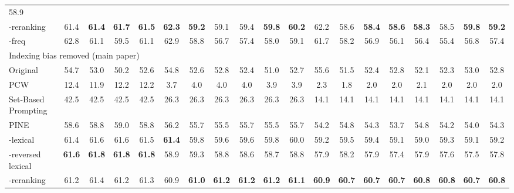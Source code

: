 \begin{table*}[!t]
{\begin{tabular}{@{}lcccccccccccccccccc@{}}
  58.9 \\ 
  \multicolumn{1}{l|}{\ours{}-reranking} &
  61.4 &
  \textbf{61.4} &
  \textbf{61.7} &
  \multicolumn{1}{c|}{\textbf{61.5}} &
  \textbf{62.3} &
  \textbf{59.2} &
   59.1 &
  59.4 &
  \textbf{59.8} &
  \multicolumn{1}{c|}{\textbf{60.2}} &
  62.2 &
  58.6 &
  \textbf{58.4} &
  \textbf{58.6} &
  \textbf{58.3} &
  58.5 &
  \textbf{59.8} &
  \textbf{59.2} \\ 
  \multicolumn{1}{l|}{\ours{}-freq} &
  62.8 &
  61.1 &
  59.5 &
  \multicolumn{1}{c|}{61.1} &
  62.9 &
  58.8 &
  56.7 &
  57.4 &
  58.0 &
  \multicolumn{1}{c|}{59.1} &
  61.7 &
  58.2 &
  56.9 &
  56.1 &
  56.4 &
  55.4 &
  56.8 &
  57.4 \\
  \midrule
\multicolumn{19}{l}{Indexing bias removed (main paper)} \\ \midrule
\multicolumn{1}{l|}{Original} &
  54.7 &
  53.0 &
  50.2 &
  \multicolumn{1}{c|}{52.6} &
  54.8 &
  52.6 &
  52.8 &
  52.4 &
  51.0 &
  \multicolumn{1}{c|}{52.7} &
  55.6 &
  51.5 &
  52.4 &
  52.8 &
  52.1 &
  52.3 &
  53.0 &
  52.8 \\
\multicolumn{1}{l|}{PCW} &
  12.4 &
  11.9 &
  12.2 &
  \multicolumn{1}{c|}{12.2} &
  \phantom{0}3.7 &
   \phantom{0}4.0 &
   \phantom{0}4.0 &
   \phantom{0}4.0 &
   \phantom{0}3.9 &
  \multicolumn{1}{c|}{ \phantom{0}3.9} &
   \phantom{0}2.3 &
   \phantom{0}1.8 &
   \phantom{0}2.0 &
   \phantom{0}2.0 &
   \phantom{0}2.1 &
   \phantom{0}2.0 &
   \phantom{0}2.0 &
   \phantom{0}2.0 \\
\multicolumn{1}{l|}{Set-Based Prompting} &
  42.5 &
  42.5 &
  42.5 &
  \multicolumn{1}{c|}{42.5} &
  26.3 &
  26.3 &
  26.3 &
  26.3 &
  26.3 &
  \multicolumn{1}{c|}{26.3} &
  14.1 &
  14.1 &
  14.1 &
  14.1 &
  14.1 &
  14.1 &
  14.1 &
  14.1 \\
\multicolumn{1}{l|}{PINE} &
  58.6 &
  58.8 &
  59.0 &
  \multicolumn{1}{c|}{58.8} &
  56.2 &
  55.7 &
  55.5 &
  55.7 &
  55.5 &
  \multicolumn{1}{c|}{55.7} &
  54.2 &
  54.8 &
  54.3 &
  53.7 &
  54.8 &
  54.2 &
  54.0 &
  54.3 \\
\multicolumn{1}{l|}{\ours{}-lexical} &
  61.4 &
  61.6 &
  61.6 &
  \multicolumn{1}{c|}{61.5} &
  \textbf{61.4} &
  59.8 &
  59.6 &
  59.6 &
  59.8 &
  \multicolumn{1}{c|}{60.0} &
59.2 &
59.5 &
59.4 &
59.1 &
59.0 &
59.3 &
59.1 &
59.2 \\
\multicolumn{1}{l|}{\ours{}-reversed lexical} &
  \textbf{61.6} &
  \textbf{61.8} &
  \textbf{61.8} &
  \multicolumn{1}{c|}{\textbf{61.8}} &
  58.9 &
  59.3 &
  58.8 &
  58.6 &
  58.7 &
  \multicolumn{1}{c|}{58.8} &
  57.9 &
  58.2 &
  57.9 &
  57.4 &
  57.9 &
  57.6 &
  57.5 &
  57.8 \\
  \multicolumn{1}{l|}{\ours{}-reranking} &
  61.2 &
  61.4 &
  61.2 &
  \multicolumn{1}{c|}{61.3} &
  60.9 &
  \textbf{61.0} &
  \textbf{61.2} &
  \textbf{61.2} &
  \textbf{61.2} &
  \multicolumn{1}{c|}{\textbf{61.1}} &
\textbf{60.9} &
\textbf{60.7} &
\textbf{60.7} &
\textbf{60.7} &
\textbf{60.8} &
\textbf{60.8} &
\textbf{60.7} &
\textbf{60.8} \\


\end{tabular}}
\end{table*}
